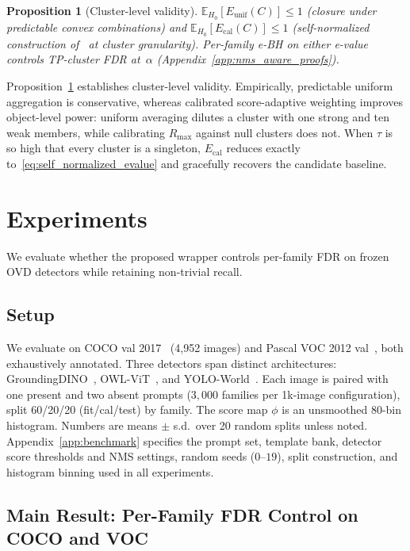 \documentclass{article}
\newtheorem{proposition}{Proposition}
\theoremstyle{remark}
\newcommand{\1}{\mathbf{1}}
\begin{document}
\begin{proposition}[Cluster-level validity]
\label{prop:calibrated_cluster}
$\mathbb{E}_{H_0}[E_{\mathrm{unif}}(C)]\le1$ (closure under predictable
convex combinations) and
$\mathbb{E}_{H_0}[E_{\mathrm{cal}}(C)]\le1$ (self-normalized
construction of~\citet{vovk2021values} at cluster granularity). Per-family
e-BH on either e-value controls TP-cluster FDR at~$\alpha$ (Appendix~\ref{app:nms_aware_proofs}).
\end{proposition}

Proposition~\ref{prop:calibrated_cluster} establishes cluster-level
validity. Empirically, predictable uniform aggregation is conservative,
whereas calibrated score-adaptive weighting improves object-level
power: uniform averaging dilutes a cluster with one strong and ten weak
members, while calibrating $R_{\max}$ against null clusters does not. When $\tau$ is so high that every cluster is a
singleton, $E_{\mathrm{cal}}$ reduces exactly
to~\eqref{eq:self_normalized_evalue} and gracefully recovers the
candidate baseline.

\section{Experiments}
\label{sec:experiments}

We evaluate whether the proposed wrapper controls per-family FDR
on frozen OVD detectors while retaining non-trivial recall.

\subsection{Setup}

We evaluate on COCO val 2017~\cite{lin2014microsoft} (4{,}952 images) and
Pascal VOC 2012 val~\cite{everingham2010pascal}, both exhaustively annotated.
Three detectors span distinct architectures:
GroundingDINO~\cite{liu2024grounding},
OWL-ViT~\cite{minderer2022simple}, and
YOLO-World~\cite{cheng2024yolo}. Each image is paired with one present
and two absent prompts ($3{,}000$ families per 1k-image configuration),
split 60/20/20 (fit/cal/test) by family. The score map $\phi$ is an
unsmoothed 80-bin histogram. Numbers are means $\pm$ s.d.\ over 20 random
splits unless noted. Appendix~\ref{app:benchmark} specifies the prompt
set, template bank, detector score thresholds and NMS settings, random
seeds ($0$--$19$), split construction, and histogram binning used in
all experiments.

\subsection{Main Result: Per-Family FDR Control on COCO and VOC}
\end{document}
